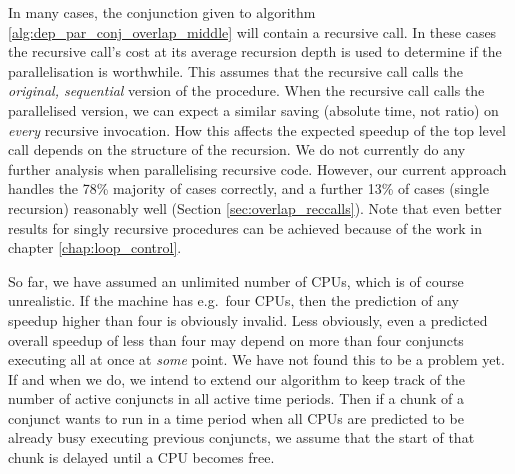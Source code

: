 In many cases,
the conjunction given to algorithm \ref{alg:dep_par_conj_overlap_middle}
will contain a recursive call.
In these cases the recursive call's cost at its average recursion depth is
used to determine if the parallelisation is worthwhile.
This assumes that the recursive call
calls the \emph{original, sequential} version of the procedure.
When the recursive call calls the parallelised version,
we can expect a similar saving (absolute time, not ratio)
on \emph{every} recursive invocation.
How this affects the expected speedup of the top level call
depends on the structure of the recursion.
We do not currently do any further analysis when parallelising recursive
code.
However, our current approach handles the 78\% majority of cases correctly,
and a further 13\% of cases (single recursion) reasonably well
(Section \ref{sec:overlap_reccalls}).
Note that even better results for singly recursive procedures can be
achieved because of the work in chapter \ref{chap:loop_control}.

So far, we have assumed an unlimited number of CPUs,
which is of course unrealistic.
If the machine has e.g.\ four CPUs,
then the prediction of any speedup higher than four is obviously invalid.
Less obviously,
even a predicted overall speedup of less than four may depend
on more than four conjuncts executing all at once at \emph{some} point.
We have not found this to be a problem yet.
If and when we do,
we intend to extend our algorithm to keep track
of the number of active conjuncts in all active time periods.
Then if a chunk of a conjunct wants to run in a time period
when all CPUs are predicted to be already busy executing previous conjuncts,
we assume that the start of that chunk is delayed until a CPU becomes free.

